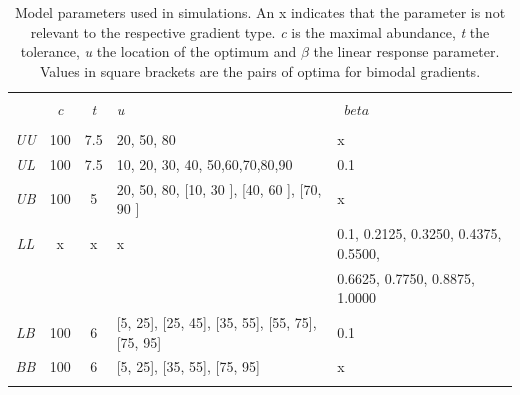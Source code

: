 \documentclass[a4paper,11pt]{article}
\begin{document}
	\captionsetup[table]{name=Table S}
	\begin{table}[!htbp] 
		\centering 
        \caption{
            Model parameters used in simulations. An x indicates that the parameter is not relevant to the respective gradient type. \textit{c} is the maximal abundance, \textit{t} the tolerance, \textit{u} the location of the optimum and $\beta$ the  linear response parameter. Values in square brackets are the pairs of optima for bimodal gradients.
        }
        \label{tab:mvglm:ss} 
        \begin{tabular}{@{\extracolsep{5pt}} cccll}
			\\[-1.8ex]\hline 
            \hline \\[-1.8ex] 
			    & \textit{c} & \textit{t} & \textit{u} &\ $beta$ \\
			\hline \\[-1.8ex]
				\textit{UU} & 100 & 7.5 & 20, 50, 80  & x                 \\
				\textit{UL} & 100 & 7.5 & 10, 20, 30, 40, 50,60,70,80,90 &  0.1  \\
				\textit{UB} & 100 & 5   & 20, 50, 80,  [10, 30 ],  [40, 60 ],  [70, 90 ]  & x \\
				\textit{LL}   & x   & x   & x & 0.1, 0.2125, 0.3250, 0.4375, 0.5500, \\
				&&&& 0.6625, 0.7750, 0.8875, 1.0000 &      \\ 
			    \textit{LB}  & 100 & 6   & [5, 25], [25, 45], [35, 55], [55, 75], [75, 95] & 0.1   \\
				\textit{BB}   & 100 & 6   & [5, 25], [35, 55], [75, 95] & x  \\
			\hline \\[-1.8ex] 
	    \end{tabular}
		\label{tab:SimDet}
	\end{table}
    \captionsetup[figure]{name=Figure S}
\end{document}
